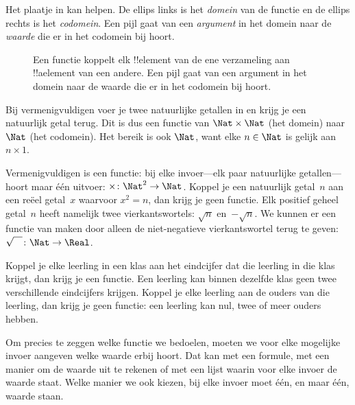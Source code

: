 \documentclass[openany]{memoir}
\begin{document}
Het plaatje in  kan helpen. De ellips links is het
\emph{domein} van de functie en de ellips rechts is het \emph{codomein}.
Een pijl gaat van een \emph{argument} in het domein naar de \emph{waarde} die
er in het codomein bij hoort.

\begin{figure}
  \caption{Een functie koppelt elk !!{element} van de ene verzameling aan
    !!a{element} van een andere. Een pijl gaat van een argument in het
    domein naar de waarde die er in het codomein bij hoort.}
\end{figure}

\begin{ex}
Bij vermenigvuldigen voer je twee natuurlijke getallen in en krijg je een
natuurlijk getal terug. Dit is dus een functie van $\Nat \times \Nat$ (het
domein) naar $\Nat$ (het codomein). Het bereik is ook $\Nat$, want elke
$n \in \Nat$ is gelijk aan $n \times 1$.
\end{ex}

\begin{ex}
Vermenigvuldigen is een functie: bij elke invoer---elk paar natuurlijke
getallen---hoort maar één uitvoer: $\times \colon \Nat^2 \to
\Nat$. Koppel je een natuurlijk getal~$n$ aan een reëel getal~$x$ waarvoor
$x^2 = n$, dan krijg je geen functie. Elk positief geheel getal~$n$ heeft
namelijk twee vierkantswortels: $\sqrt{n}$ en~$-\sqrt{n}$. We kunnen er een
functie van maken door alleen de niet-negatieve vierkantswortel terug te geven:
$\sqrt{\phantom{X}} \colon \Nat \to \Real$.
\end{ex}

\begin{ex}
Koppel je elke leerling in een klas aan het eindcijfer dat die leerling in die
klas krijgt, dan krijg je een functie. Een leerling kan binnen dezelfde klas
geen twee verschillende eindcijfers krijgen. Koppel je elke leerling aan de
ouders van die leerling, dan krijg je geen functie: een leerling kan nul, twee
of meer ouders hebben.
\end{ex}

\begin{explain}
Om precies te zeggen welke functie we bedoelen, moeten we voor elke mogelijke
invoer aangeven welke waarde erbij hoort. Dat kan met een formule, met een
manier om de waarde uit te rekenen of met een lijst waarin voor elke invoer de
waarde staat.
Welke manier we ook kiezen, bij elke invoer moet één, en maar één, waarde staan.
\end{explain}
\end{document}
